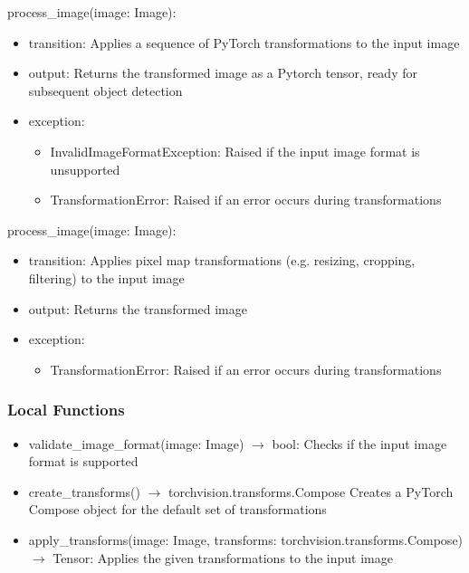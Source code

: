 \documentclass[12pt, titlepage]{article}
\begin{document}
\noindent process{\_}image(image: Image):
\begin{itemize}
\item transition: Applies a sequence of PyTorch transformations to the input image 
\item output: Returns the transformed image as a Pytorch tensor, ready for subsequent object detection
\item exception: 
\begin{itemize}
  \item InvalidImageFormatException: Raised if the input image format is unsupported
  \item TransformationError: Raised if an error occurs during transformations
\end{itemize}

\end{itemize}
\noindent process{\_}image(image: Image):
\begin{itemize}
  \item transition: Applies pixel map transformations (e.g. resizing, cropping, filtering) to the input image
  \item output: Returns the transformed image
  \item exception: 
  \begin{itemize}
    \item TransformationError: Raised if an error occurs during transformations
  \end{itemize}
  
  \end{itemize}

\subsubsection{Local Functions}

\begin{itemize}
  \item validate{\_}image{\_}format(image: Image) $\rightarrow$ bool: Checks if the input image format is supported
  \item create{\_}transforms() $\rightarrow$ torchvision.transforms.Compose\: Creates a PyTorch Compose object for the default set of transformations
  \item apply{\_}transforms(image: Image, transforms: torchvision.transforms.Compose) $\rightarrow$ Tensor: Applies the given transformations to the input image
\end{itemize}

\newpage
\end{document}
